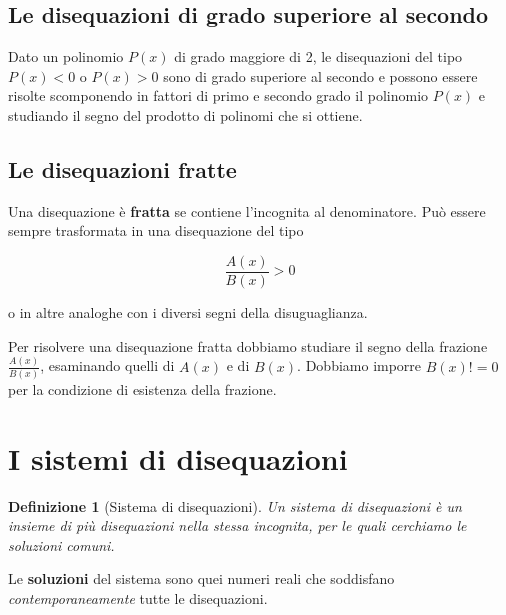 \documentclass[12pt, letterpaper]{article}
\newtheorem{definition}{Definizione}[section]
\begin{document}
	\subsection{Le disequazioni di grado superiore al secondo}
	Dato un polinomio $P(x)$ di grado maggiore di 2, le disequazioni del tipo $P(x)<0$ o $P(x)>0$ sono di grado superiore al secondo e possono essere risolte scomponendo in fattori di primo e secondo grado il polinomio $P(x)$ e studiando il segno del prodotto di polinomi che si ottiene.
	
	\subsection{Le disequazioni fratte}
	Una disequazione è \textbf{fratta} se contiene l'incognita al denominatore. Può essere sempre trasformata in una disequazione del tipo
	
	\[
		\frac{A(x)}{B(x)} > 0
	\]
	
	o in altre analoghe con i diversi segni della disuguaglianza.
	
	Per risolvere una disequazione fratta dobbiamo studiare il segno della frazione $\frac{A(x)}{B(x)}$, esaminando quelli di $A(x)$ e di $B(x)$. Dobbiamo imporre $B(x) != 0$ per la condizione di esistenza della frazione.
	
	\section{I sistemi di disequazioni}
	
	\begin{definition}[Sistema di disequazioni]
		Un sistema di disequazioni è un insieme di più disequazioni nella stessa incognita, per le quali cerchiamo le soluzioni comuni.
	\end{definition}
	
	Le \textbf{soluzioni} del sistema sono quei numeri reali che soddisfano \textit{contemporaneamente} tutte le disequazioni.
	
\end{document}
